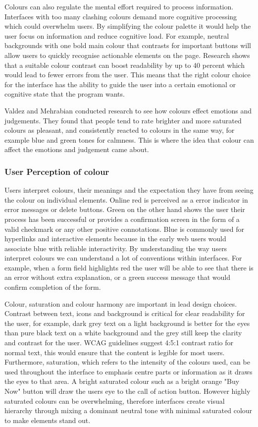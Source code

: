 \documentclass[]{project_final}
\begin{document}
Colours can also regulate the mental effort required to process information. Interfaces with too many clashing colours demand more cognitive processing which could overwhelm users. By simplifying the colour palette it would help the user focus on information and reduce cognitive load. For example, neutral backgrounds with one bold main colour that contrasts for important buttons will allow users to quickly recognise actionable elements on the page. Research shows that a suitable colour contrast can boost readability by up to 40 percent which would lead to fewer errors from the user. This means that the right colour choice for the interface has the ability to guide the user into a certain emotional or cognitive state that the program wants.

Valdez and Mehrabian conducted research to see how colours effect emotions and judgements. They found that people tend to rate brighter and more saturated colours as pleasant, and consistently reacted to colours in the same way, for example blue and green tones for calmness. This is where the idea that colour can affect the emotions and judgement came about.\cite{article}


\subsubsection{User Perception of colour}

Users interpret colours, their meanings and the expectation they have from seeing the colour on individual elements. Online red is perceived as a error indicator in error messages or delete buttons. Green on the other hand shows the user their process has been successful or provides a confirmation screen in the form of a valid checkmark or any other positive connotations. Blue is commonly used for hyperlinks and interactive elements because in the early web users would associate blue with reliable interactivity. By understanding the way users interpret colours we can understand a lot of conventions within interfaces. For example, when a form field highlights red the user will be able to see that there is an error without extra explanation, or a green success message that would confirm completion of the form.

Colour, saturation and colour harmony are important in lead design choices. Contrast between text, icons and background is critical for clear readability for the user, for example, dark grey text on a light background is better for the eyes than pure black text on a white background and the grey still keep the clarity and contrast for the user. WCAG guidelines suggest 4:5:1 contrast ratio for normal text, this would ensure that the content is legible for most users. Furthermore, saturation, which refers to the intensity of the colours used, can be used throughout the interface to emphasis centre parts or information as it draws the eyes to that area. A bright saturated colour such as a bright orange "Buy Now" button will draw the users eye to the call of action button. However highly saturated colours can be overwhelming, therefore interfaces create visual hierarchy through mixing a dominant neutral tone with minimal saturated colour to make elements stand out.
\end{document}
